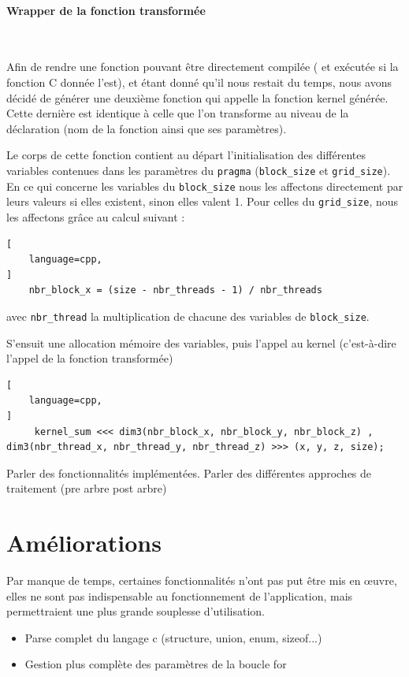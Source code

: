 \documentclass{article}
\begin{document}
	\paragraph{Wrapper de la fonction transformée}
	~~\\
	\indent
	
	Afin de rendre une fonction pouvant être directement compilée ( et exécutée si la fonction C donnée l'est), et étant donné qu'il nous restait du temps, nous avons décidé de générer une deuxième fonction qui appelle la fonction kernel générée. Cette dernière est identique à celle que l'on transforme au niveau de la déclaration (nom de la fonction ainsi que ses paramètres).
	
	Le corps de cette fonction contient au départ l'initialisation des différentes variables contenues dans les paramètres du \verb|pragma| (\verb|block_size| et \verb|grid_size|).
	En ce qui concerne les variables du \verb|block_size| nous les affectons directement par leurs valeurs si elles existent, sinon elles valent 1.
	Pour celles du \verb|grid_size|, nous les affectons grâce au calcul suivant : 
	\begin{lstlisting}[
    language=cpp,
]
	nbr_block_x = (size - nbr_threads - 1) / nbr_threads
\end{lstlisting}	
	 avec \verb|nbr_thread| la multiplication de chacune des variables de \verb|block_size|.
	
	S'ensuit une allocation mémoire des variables, puis l'appel au kernel (c'est-à-dire l'appel de la fonction transformée)
	\begin{lstlisting}[
    language=cpp,
]
	 kernel_sum <<< dim3(nbr_block_x, nbr_block_y, nbr_block_z) , dim3(nbr_thread_x, nbr_thread_y, nbr_thread_z) >>> (x, y, z, size);
\end{lstlisting}	

	\newpage


Parler des fonctionnalités implémentées.
	Parler des différentes approches de traitement (pre arbre post arbre)
	
	
	
	\section{Améliorations}
	Par manque de temps, certaines fonctionnalités n'ont pas put être mis en œuvre, elles ne sont pas indispensable au fonctionnement de l'application, mais permettraient une plus grande souplesse d'utilisation.
	\begin{itemize}
		\item Parse complet du langage c (structure, union, enum, sizeof...)
		\item Gestion plus complète des paramètres de la boucle for
	\end{itemize}
	
\end{document}
